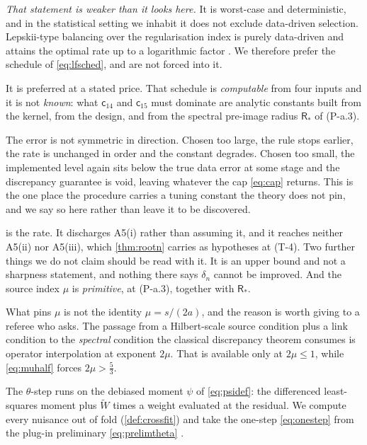\documentclass[
  12pt]{article}
\newcommand{\1}[1]{\mathds{1}\left[#1\right]}
\theoremstyle{plain}
\theoremstyle{definition}
\theoremstyle{definition}
\theoremstyle{remark}
\begin{document}
\emph{That statement is weaker than it looks here.} It is worst-case and
deterministic, and in the statistical setting we inhabit it does not
exclude data-driven selection. Lepskii-type balancing over the
regularisation index is purely data-driven and attains the optimal rate
up to a logarithmic factor \citep[see][]{dunker2021,lepskii1990}. We
therefore prefer the schedule of \eqref{eq:lfsched}, and are not forced
into it.

It is preferred at a stated price. That schedule is \emph{computable}
from four inputs and it is not \emph{known}: what \(\mathsf c_{14}\) and
\(\mathsf c_{15}\) must dominate are analytic constants built from the
kernel, from the design, and from the spectral pre-image radius
\(\mathsf R_\ast\) of (P-a.3).

The error is not symmetric in direction. Chosen too large, the rule
stops earlier, the rate is unchanged in order and the constant degrades.
Chosen too small, the implemented level again sits below the true data
error at some stage and the discrepancy guarantee is void, leaving
whatever the cap \eqref{eq:cap} returns. This is the one place the
procedure carries a tuning constant the theory does not pin, and we say
so here rather than leave it to be discovered.

 is the rate. It discharges A5(i) rather than assuming
it, and it reaches neither A5(ii) nor A5(iii), which \cref{thm:rootn}
carries as hypotheses at (T-4). Two further things we do not claim
should be read with it. It is an upper bound and not a sharpness
statement, and nothing there says \(\delta_n\) cannot be improved. And
the source index \(\mu\) is \emph{primitive}, at (P-a.3), together with
\(\mathsf R_\ast\).

What pins \(\mu\) is not the identity \(\mu=s/(2a)\), and the reason is
worth giving to a referee who asks. The passage from a Hilbert-scale
source condition plus a link condition to the \emph{spectral} condition
the classical discrepancy theorem consumes is operator interpolation at
exponent \(2\mu\). That is available only at \(2\mu\le1\), while
\eqref{eq:muhalf} forces \(2\mu>\tfrac53\).

The \(\theta\)-step runs on the debiased moment \(\psi\) of
\eqref{eq:psidef}: the differenced least-squares moment plus
\(\widetilde W\) times a weight evaluated at the residual. We compute
every nuisance out of fold (\cref{def:crossfit}) and take the one-step
\eqref{eq:onestep} from the plug-in preliminary \eqref{eq:prelimtheta}
\citep[see][]{chernozhukov2018dml,neweyrobins2018}.
\end{document}
